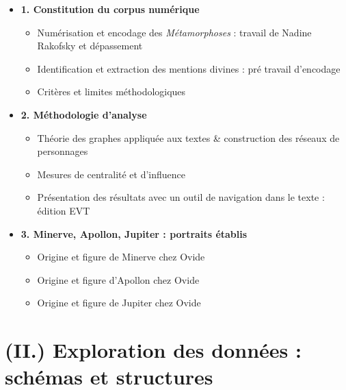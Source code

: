 \documentclass[
  letterpaper,
  DIV=11,
  numbers=noendperiod]{scrreprt}
\providecommand{\tightlist}{%
  \setlength{\itemsep}{0pt}\setlength{\parskip}{0pt}}\usepackage{longtable,booktabs,array}
\begin{document}
\begin{itemize}
\tightlist
\item
  \textbf{1. Constitution du corpus numérique}

  \begin{itemize}
  \tightlist
  \item
    Numérisation et encodage des \emph{Métamorphoses} : travail de
    Nadine Rakofsky et dépassement
  \item
    Identification et extraction des mentions divines : pré travail
    d'encodage
  \item
    Critères et limites méthodologiques
  \end{itemize}
\item
  \textbf{2. Méthodologie d'analyse }

  \begin{itemize}
  \tightlist
  \item
    Théorie des graphes appliquée aux textes \& construction des réseaux
    de personnages
  \item
    Mesures de centralité et d'influence
  \item
    Présentation des résultats avec un outil de navigation dans le texte
    : édition EVT
  \end{itemize}
\item
  \textbf{3. Minerve, Apollon, Jupiter : portraits établis}

  \begin{itemize}
  \tightlist
  \item
    Origine et figure de Minerve chez Ovide
  \item
    Origine et figure d'Apollon chez Ovide
  \item
    Origine et figure de Jupiter chez Ovide
  \end{itemize}
\end{itemize}

\section{\texorpdfstring{\textbf{(II.) Exploration des données : schémas
et
structures}}{(II.) Exploration des données : schémas et structures}}\label{ii.-exploration-des-donnuxe9es-schuxe9mas-et-structures}
\end{document}
